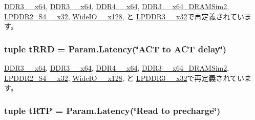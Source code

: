 \hyperlink{classDRAMCtrl_1_1DDR3__1600__x64_aeda425967c3cf2880bdc1640e9733439}{DDR3\_\_\-x64}, \hyperlink{classDRAMCtrl_1_1DDR3__2133__x64_aeda425967c3cf2880bdc1640e9733439}{DDR3\_\_\-x64}, \hyperlink{classDRAMCtrl_1_1DDR4__2400__x64_aeda425967c3cf2880bdc1640e9733439}{DDR4\_\_\-x64}, \hyperlink{classDRAMCtrl_1_1DDR3__1333__x64__DRAMSim2_aeda425967c3cf2880bdc1640e9733439}{DDR3\_\_\-x64\_\-DRAMSim2}, \hyperlink{classDRAMCtrl_1_1LPDDR2__S4__1066__x32_aeda425967c3cf2880bdc1640e9733439}{LPDDR2\_\-S4\_\_\-x32}, \hyperlink{classDRAMCtrl_1_1WideIO__200__x128_aeda425967c3cf2880bdc1640e9733439}{WideIO\_\_\-x128}, と \hyperlink{classDRAMCtrl_1_1LPDDR3__1600__x32_aeda425967c3cf2880bdc1640e9733439}{LPDDR3\_\_\-x32}で再定義されています。\hypertarget{classDRAMCtrl_1_1DRAMCtrl_aea95c8f8e95256590d16b5e9bcca1f51}{
\subsubsection[{tRRD}]{\setlength{\rightskip}{0pt plus 5cm}tuple {\bf tRRD} = Param.Latency(\char`\"{}ACT to ACT delay\char`\"{})}}
\label{classDRAMCtrl_1_1DRAMCtrl_aea95c8f8e95256590d16b5e9bcca1f51}


\hyperlink{classDRAMCtrl_1_1DDR3__1600__x64_ad1724b7d6484bbc6051f43d4ae9e16d2}{DDR3\_\_\-x64}, \hyperlink{classDRAMCtrl_1_1DDR3__2133__x64_ad1724b7d6484bbc6051f43d4ae9e16d2}{DDR3\_\_\-x64}, \hyperlink{classDRAMCtrl_1_1DDR4__2400__x64_ad1724b7d6484bbc6051f43d4ae9e16d2}{DDR4\_\_\-x64}, \hyperlink{classDRAMCtrl_1_1DDR3__1333__x64__DRAMSim2_ad1724b7d6484bbc6051f43d4ae9e16d2}{DDR3\_\_\-x64\_\-DRAMSim2}, \hyperlink{classDRAMCtrl_1_1LPDDR2__S4__1066__x32_ad1724b7d6484bbc6051f43d4ae9e16d2}{LPDDR2\_\-S4\_\_\-x32}, \hyperlink{classDRAMCtrl_1_1WideIO__200__x128_ad1724b7d6484bbc6051f43d4ae9e16d2}{WideIO\_\_\-x128}, と \hyperlink{classDRAMCtrl_1_1LPDDR3__1600__x32_ad1724b7d6484bbc6051f43d4ae9e16d2}{LPDDR3\_\_\-x32}で再定義されています。\hypertarget{classDRAMCtrl_1_1DRAMCtrl_a3498a796c766f5549f38ec67b86afbb2}{
\subsubsection[{tRTP}]{\setlength{\rightskip}{0pt plus 5cm}tuple {\bf tRTP} = Param.Latency(\char`\"{}Read to precharge\char`\"{})}}
\label{classDRAMCtrl_1_1DRAMCtrl_a3498a796c766f5549f38ec67b86afbb2}


